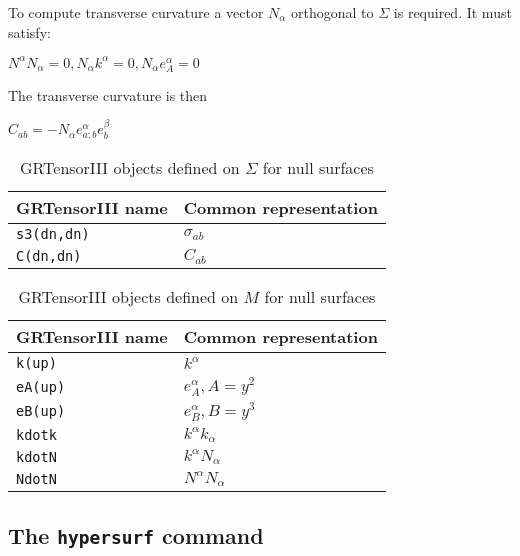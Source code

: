 \documentclass{article}
\begin{document}
To compute transverse curvature a vector $N_\alpha$ orthogonal to $\Sigma$ is required. It must satisfy:
\begin{center}
$N^\alpha N_\alpha = 0, N_\alpha k^\alpha = 0, N_\alpha e^\alpha_A = 0$
\end{center}
The transverse curvature is then 
\begin{center}
$C_{ab} = - N_\alpha e^\alpha_{a;b} e^\beta_b$
\end{center}

\renewcommand{\arraystretch}{1.5}
\begin{table}[h]
  \begin{center}
    \begin{tabular}{ll}\hline\hline
      \textbf{GRTensorIII name} & \textbf{Common representation}\\ \hline
      \texttt{s3(dn,dn)}        & $\sigma_{ab} $  \\
      \texttt{C(dn,dn)}        & $C_{ab} $  \\
    \end{tabular}
    \caption{GRTensorIII objects defined on $\Sigma$ for null surfaces}
    \label{tab:null1}
  \end{center}
\end{table}

\begin{table}[ht]
  \begin{center}
    \begin{tabular}{ll}\hline\hline
      \textbf{GRTensorIII name} & \textbf{Common representation}\\ \hline
      \texttt{k(up)}        & $k^\alpha$  \\
      \texttt{eA(up)}        & $e^\alpha_{A}, A=y^2 $  \\
      \texttt{eB(up)}        & $e^\alpha_{B}, B=y^3 $  \\
      \texttt{kdotk}        & $k^\alpha k_\alpha$  \\
      \texttt{kdotN}        & $k^\alpha N_\alpha$  \\
      \texttt{NdotN}        & $N^\alpha N_\alpha$  \\
    \end{tabular}
    \caption{GRTensorIII objects defined on $M$ for null surfaces}
    \label{tab:null1}
  \end{center}
\end{table}


\FloatBarrier
\subsection{The \texttt{hypersurf} command}
\end{document}

